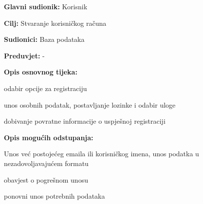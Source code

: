 					\noindent {}
					\begin{packed_item}
	
						\item \textbf{Glavni sudionik: }Korisnik
						\item  \textbf{Cilj:} Stvaranje korisničkog računa
						\item  \textbf{Sudionici:} Baza podataka
						\item  \textbf{Preduvjet:} -
						\item  \textbf{Opis osnovnog tijeka:}
						
						\item[] \begin{packed_enum}
	
							\item odabir opcije za registraciju 
							\item unos osobnih podatak, postavljanje lozinke i odabir uloge
							\item dobivanje povratne informacije o uspješnoj registraciji
							
						\end{packed_enum}
						
						\item  \textbf{Opis mogućih odstupanja:}
						
						\item[] \begin{packed_item}
	
							\item[2.a] Unos već postojećeg emaila ili korisničkog imena, unos podatka u nezadovoljavajućem formatu
							\item[] \begin{packed_enum}
								
								\item obavjest o pogrešnom unosu
								\item ponovni unos potrebnih podataka
								
							\end{packed_enum}
							
							
						\end{packed_item}
					\end{packed_item}
					
